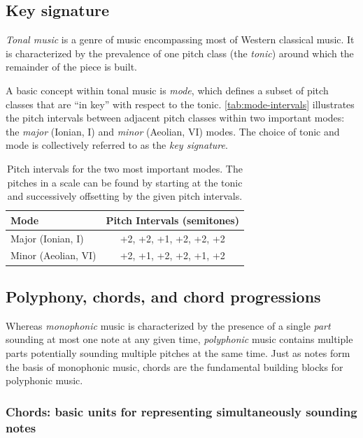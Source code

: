 \documentclass[dissertation.tex]{subfiles}
\begin{document}
\subsection{Key signature}

\emph{Tonal music} is a genre of music encompassing most of Western classical
music. It is characterized by the prevalence of one pitch class (the
\emph{tonic}) around which the remainder of the piece is built.

A basic concept within tonal music is \emph{mode}, which defines a subset of
pitch classes that are ``in key'' with respect to the tonic.
\autoref{tab:mode-intervals} illustrates the pitch intervals between adjacent
pitch classes within two important modes: the \emph{major} (Ionian, I) and
\emph{minor} (Aeolian, VI) modes. The choice of tonic and mode is collectively
referred to as the \emph{key signature}.

\begin{table}[htpb]
    \centering
    \begin{tabular}{lc}
        \toprule
        Mode & Pitch Intervals (semitones) \\
        \midrule
        Major (Ionian, I) & +2, +2, +1, +2, +2, +2 \\
        Minor (Aeolian, VI) & +2, +1, +2, +2, +1, +2 \\
        \bottomrule
    \end{tabular}
    \caption{Pitch intervals for the two most important modes\cite{freedman2015correlational}. The pitches
    in a scale can be found by starting at the tonic and successively
    offsetting by the given pitch intervals.}
    \label{tab:mode-intervals}
\end{table}

\subsection{Polyphony, chords, and chord progressions}

Whereas \emph{monophonic} music is characterized by the presence of a single
\emph{part} sounding at most one note at any given time, \emph{polyphonic}
music contains multiple parts potentially sounding multiple pitches at the same
time. Just as notes form the basis of monophonic music, chords are the fundamental
building blocks for polyphonic music.

\subsubsection{Chords: basic units for representing simultaneously sounding notes}
\end{document}

